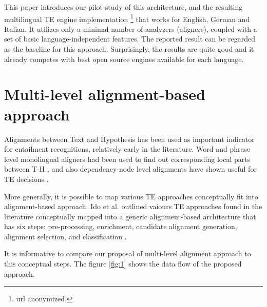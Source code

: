 \documentclass[11pt,letterpaper]{article}
\begin{document}
This paper introduces our pilot study of this architecture, and the
resulting multilingual TE engine implementation \footnote{url
  anonymized.} that works for English, German and Italian. It utilizes 
only a minimal number of analyzers (aligners), coupled with a set of
basic language-independent features. The reported result can be
regarded as the baseline for this approach. Surprisingly, the results
are quite good and it already competes with best open source engines
available for each language.   


\section{Multi-level alignment-based approach}
Alignments between Text and Hypothesis has been used as important
indicator for entailment recognitions, relatively early in the
literature. Word and phrase level monolingual aligners had been used
to find out corresponding local parts between T-H \cite{}, and also
dependency-node level alignments have shown useful for TE decisions
\cite{}.     

More generally, it is possible to map various TE approaches
conceptually fit into alignment-based approach. Ido et al. outlined
vaiours TE approaches found in the literature conceptually mapped into 
a generic alignment-based architecture that has six steps:  
pre-processing, enrichment, candidate alignment generation, alignment
selection, and classification \cite{RTE-book}.  

It is informative to compare our proposal of multi-level alignment
approach to this conceptual steps. The figure \ref{fig:1} shows the
data flow of the proposed approach. 
\end{document}
